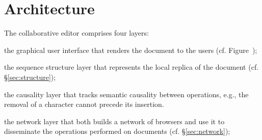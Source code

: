 
\section{Architecture}
\label{sec:architecture}

The collaborative editor \CRATE comprises four layers:
\begin{inparaenum}[(i)]
\item the graphical user interface that renders the document to the users
  (cf. Figure~);
\item the sequence structure layer that represents the local replica of the
  document (cf. §\ref{sec:structure});
\item the causality layer that tracks semantic causality between operations,
  e.g., the removal of a character cannot precede its insertion.
\item the network layer that both builds a network of browsers and use it to
  disseminate the operations performed on documents (cf. §\ref{sec:network});
\end{inparaenum}

